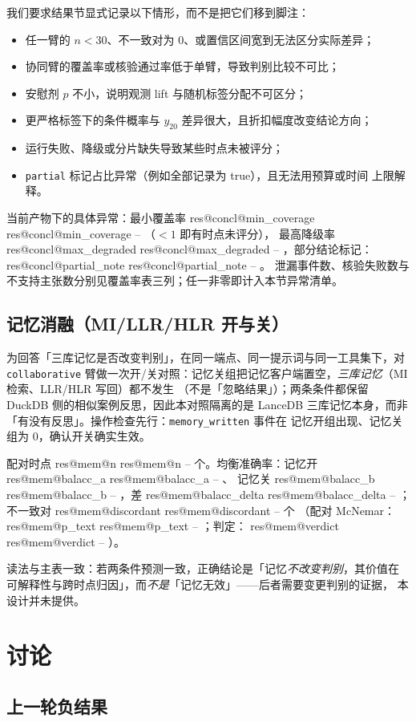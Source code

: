 \documentclass[UTF8,fontset=fandol,11pt,a4paper]{ctexart}
\makeatletter
\newcommand{\RESULT}[2]{%
  \ifcsname res@#1@#2\endcsname
    \csname res@#1@#2\endcsname
  \else
    --%
  \fi}
\makeatother
\begin{document}
我们要求结果节显式记录以下情形，而不是把它们移到脚注：
\begin{itemize}
  \item 任一臂的 $n<30$、不一致对为 0、或置信区间宽到无法区分实际差异；
  \item 协同臂的覆盖率或核验通过率低于单臂，导致判别比较不可比；
  \item 安慰剂 $p$ 不小，说明观测 lift 与随机标签分配不可区分；
  \item 更严格标签下的条件概率与 $y_{20}$ 差异很大，且折扣幅度改变结论方向；
  \item 运行失败、降级或分片缺失导致某些时点未被评分；
  \item \texttt{partial} 标记占比异常（例如全部记录为 true），且无法用预算或时间
        上限解释。
\end{itemize}
当前产物下的具体异常：最小覆盖率 \RESULT{concl}{min_coverage}（$<1$ 即有时点未评分），
最高降级率 \RESULT{concl}{max_degraded}，部分结论标记：\RESULT{concl}{partial_note}。
泄漏事件数、核验失败数与不支持主张数分别见覆盖率表三列；任一非零即计入本节异常清单。

\subsection{记忆消融（MI/LLR/HLR 开与关）}
\label{sec:memory-ablation}

为回答「三库记忆是否改变判别」，在同一端点、同一提示词与同一工具集下，对
\texttt{collaborative} 臂做一次开/关对照：记忆关组把记忆客户端置空，\emph{三库记忆}（MI 检索、LLR/HLR 写回）都不发生
（不是「忽略结果」）；两条条件都保留 DuckDB 侧的相似案例反思，因此本对照隔离的是
LanceDB 三库记忆本身，而非「有没有反思」。操作检查先行：\texttt{memory\_written} 事件在
记忆开组出现、记忆关组为 0，确认开关确实生效。

配对时点 \RESULT{mem}{n} 个。均衡准确率：记忆开 \RESULT{mem}{balacc_a}、
记忆关 \RESULT{mem}{balacc_b}，差 \RESULT{mem}{balacc_delta}；不一致对 \RESULT{mem}{discordant} 个
（配对 McNemar：\RESULT{mem}{p_text}；判定：\RESULT{mem}{verdict}）。

读法与主表一致：若两条件预测一致，正确结论是「记忆\emph{不改变判别}，其价值在
可解释性与跨时点归因」，而\emph{不是}「记忆无效」——后者需要变更判别的证据，
本设计并未提供。

\section{讨论}
\label{sec:discussion}

\subsection{上一轮负结果}
\end{document}
